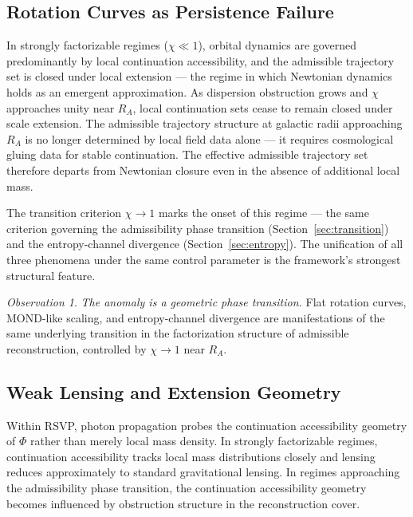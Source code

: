\documentclass[11pt, a4paper]{article}
\theoremstyle{plain}
\theoremstyle{definition}
\theoremstyle{remark}
\newtheorem{observation}[theorem]{Observation}
\newcommand{\RA}{R_{\!A}}
\begin{document}
\subsection{Rotation Curves as Persistence Failure}

In strongly factorizable regimes ($\chi \ll 1$), orbital dynamics are governed
predominantly by local continuation accessibility, and the admissible trajectory set
is closed under local extension --- the regime in which Newtonian dynamics holds as
an emergent approximation. As dispersion obstruction grows and $\chi$ approaches
unity near $\RA$, local continuation sets cease to remain closed under scale
extension. The admissible trajectory structure at galactic radii approaching $\RA$
is no longer determined by local field data alone --- it requires cosmological gluing
data for stable continuation. The effective admissible trajectory set therefore
departs from Newtonian closure even in the absence of additional local mass.

The transition criterion $\chi \to 1$ marks the onset of this regime --- the same
criterion governing the admissibility phase transition
(Section~\ref{sec:transition}) and the entropy-channel divergence
(Section~\ref{sec:entropy}). The unification of all three phenomena under the same
control parameter is the framework's strongest structural feature.

\begin{observation}
\label{obs:phase-transition-central}
\emph{The anomaly is a geometric phase transition.} Flat rotation curves, MOND-like
scaling, and entropy-channel divergence are manifestations of the same underlying
transition in the factorization structure of admissible reconstruction, controlled by
$\chi \to 1$ near $\RA$.
\end{observation}

\subsection{Weak Lensing and Extension Geometry}

Within RSVP, photon propagation probes the continuation accessibility geometry of
$\Phi$ rather than merely local mass density. In strongly factorizable regimes,
continuation accessibility tracks local mass distributions closely and lensing
reduces approximately to standard gravitational lensing. In regimes approaching the
admissibility phase transition, the continuation accessibility geometry becomes
influenced by obstruction structure in the reconstruction cover.
\end{document}
